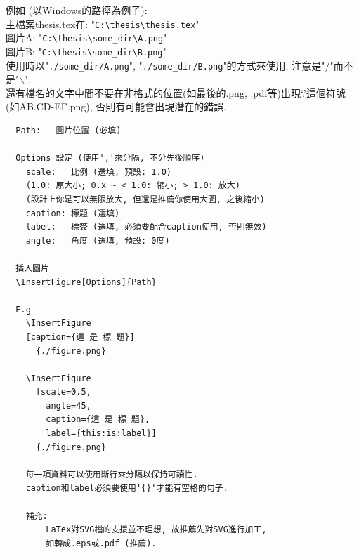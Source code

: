 \noindent 例如 (以Windows的路徑為例子):\\
主檔案thesis.tex在: "\verb|C:\thesis\thesis.tex|"\\
圖片A: "\verb|C:\thesis\some_dir\A.png|"\\
圖片B: "\verb|C:\thesis\some_dir\B.png|"\\
使用時以"\verb|./some_dir/A.png|", "\verb|./some_dir/B.png|"的方式來使用, 注意是"$/$"而不是"$\backslash$".\\

還有檔名的文字中間不要在非格式的位置(如最後的.png, .pdf等)出現`.'這個符號 (如AB.CD-EF.png), 否則有可能會出現潛在的錯誤.

\newpage
{}
  \EmptyLine
  \begin{DescriptionFrame}
  \begin{verbatim}
  Path:   圖片位置 (必填)

  Options 設定 (使用','來分隔, 不分先後順序)
    scale:   比例 (選填, 預設: 1.0)
    (1.0: 原大小; 0.x ~ < 1.0: 縮小; > 1.0: 放大)
    (設計上你是可以無限放大, 但還是推薦你使用大圖, 之後縮小)
    caption: 標題 (選填)
    label:   標簽 (選填, 必須要配合caption使用, 否則無效)
    angle:   角度 (選填, 預設: 0度)

  插入圖片
  \InsertFigure[Options]{Path}

  E.g
    \InsertFigure
    [caption={這 是 標 題}]
      {./figure.png}

    \InsertFigure
      [scale=0.5,
        angle=45,
        caption={這 是 標 題},
        label={this:is:label}]
      {./figure.png}

    每一項資料可以使用斷行來分隔以保持可讀性.
    caption和label必須要使用'{}'才能有空格的句子.

    補充:
        LaTex對SVG檔的支援並不理想, 故推薦先對SVG進行加工,
        如轉成.eps或.pdf (推薦).
  \end{verbatim}
  \end{DescriptionFrame}

